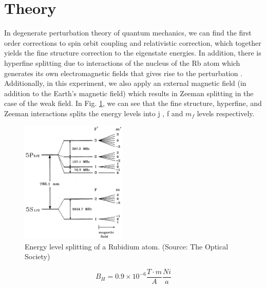 \documentclass[iop,revtex4]{emulateapj_mod}
\begin{document}
\section{Theory}\label{sec:theory}
\par In degenerate perturbation theory of quantum mechanics, we can find the first order corrections to spin orbit coupling and relativistic correction, which together yields the fine structure correction to the eigenstate energies. In addition, there is hyperfine splitting due to interactions of the nucleus of the Rb atom which generates its own electromagnetic fields that gives rise to the perturbation \cite{wiki_hyperfine}.  Additionally, in this experiment, we also apply an external magnetic field (in addition to the Earth's magnetic field) which results in Zeeman splitting in the case of the weak field. In Fig. \ref{splitting}, we can see that the fine structure, hyperfine, and Zeeman interactions splits the energy levels into j , f and $m_f$ levels respectively.
\begin{figure}[h]
\includegraphics[width=0.45\textwidth]{plots/splitting_diagram.jpeg}
\caption{Energy level splitting of a Rubidium atom. (Source: The Optical Society)}
\label{splitting}
\end{figure}
\begin{equation}\label{currentB}
B_{H} = 0.9\times 10^{-6} \frac{T\cdot m}{A} \frac{N i}{a}
\end{equation}
\end{document}
